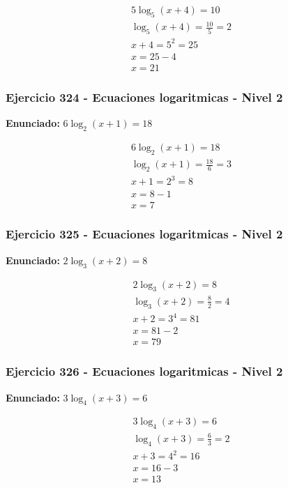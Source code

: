 \documentclass[12pt,a4paper]{article}
\begin{document}
\[
\begin{aligned}
5\log_{5}\left(x+4\right)=10\\
\log_{5}\left(x+4\right)=\frac{10}{5}=2\\
x+4=5^{2}=25\\
x=25-4\\
\boxed{x=21}
\end{aligned}
\]


\subsubsection*{Ejercicio 324 - Ecuaciones logaritmicas - Nivel 2}
\textbf{Enunciado:} \(6\log_{2}\left(x+1\right)=18\)

\[
\begin{aligned}
6\log_{2}\left(x+1\right)=18\\
\log_{2}\left(x+1\right)=\frac{18}{6}=3\\
x+1=2^{3}=8\\
x=8-1\\
\boxed{x=7}
\end{aligned}
\]


\subsubsection*{Ejercicio 325 - Ecuaciones logaritmicas - Nivel 2}
\textbf{Enunciado:} \(2\log_{3}\left(x+2\right)=8\)

\[
\begin{aligned}
2\log_{3}\left(x+2\right)=8\\
\log_{3}\left(x+2\right)=\frac{8}{2}=4\\
x+2=3^{4}=81\\
x=81-2\\
\boxed{x=79}
\end{aligned}
\]


\subsubsection*{Ejercicio 326 - Ecuaciones logaritmicas - Nivel 2}
\textbf{Enunciado:} \(3\log_{4}\left(x+3\right)=6\)

\[
\begin{aligned}
3\log_{4}\left(x+3\right)=6\\
\log_{4}\left(x+3\right)=\frac{6}{3}=2\\
x+3=4^{2}=16\\
x=16-3\\
\boxed{x=13}
\end{aligned}
\]
\end{document}
